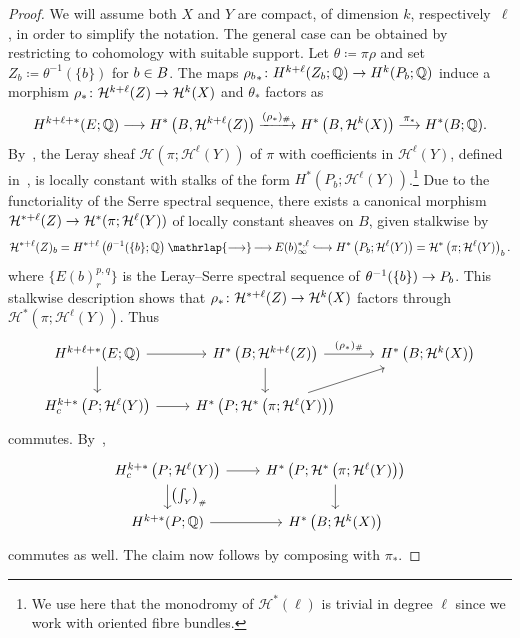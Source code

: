 \documentclass[AHL,Unicode,longabstracts]{cedram}
\newcommand{\inv}{^{-1}}
\newcommand{\cl}{\colon}
\newcommand{\bQ}{\mathbb{Q}}
\newcommand{\cH}{\mathcal{H}}
\newcommand{\xra}{\xrightarrow}
\renewcommand*{\to}{\mathchoice{\longrightarrow}{\rightarrow}{\rightarrow}{\rightarrow}}
\newcommand{\longhookrightarrow}{\lhook\joinrel\longrightarrow}
\newcommand*{\hookto}{\mathchoice{\longhookrightarrow}{\hookrightarrow}{\hookrightarrow}{\hookrightarrow}}
\newcommand*{\twoheadto}
{\mathbin{\mathrlap{\to}\mkern -2mu\to}}
\let\oldin\in
\renewcommand{\in}{\mathchoice{\oldin}{\oldin}{\,\oldin\,}{\,\oldin\,}}
\begin{document}
\begin{proof}
We will assume both $X$ and $Y$ are compact, of dimension $k$, respectively~$\ell$, in order to simplify the notation. The general case can be obtained by restricting to cohomology with suitable support. Let $\theta \coloneqq \pi\rho$ and set $Z_b \coloneqq \theta\inv(\{b\})$ for $b \in B$. The maps ${\rho_b}_*\cl H^{k+\ell}(Z_b;\bQ) \to H^k(P_b;\bQ)$ induce a morphism $\rho_*\cl \cH^{k+\ell}(Z)\to \cH^k(X)$ and $\theta_*$ factors as
\[
H^{k+\ell+*}(E;\bQ)\to H^*\left(B,\cH^{k+\ell}(Z)\right) \xra{(\rho_*)_\#} H^*\left(B,\cH^{k}(X)\right) \overset{\pi_*}{\to} H^*(B;\bQ).
\]
By~\cite[Corollary~IV.7.3]{Bre12}, the Leray sheaf $\cH(\pi;\cH^\ell(Y))$ of $\pi$ with coefficients in $\cH^\ell(Y)$, defined in~\cite[Section~IV.4]{Bre12}, is locally constant with stalks of the form $H^*(P_b;\cH^\ell(Y))$.\footnote{We use here that the monodromy of $\cH^*(\ell)$ is trivial in degree $\ell$ since we work with oriented fibre bundles.} Due to the functoriality of the Serre spectral sequence, there exists a canonical morphism $\cH^{*+\ell}(Z)\to \cH^*(\pi;\cH^\ell(Y))$ of locally constant sheaves on $B$, given stalkwise by
\[
\cH^{*+\ell}(Z)_b = H^{*+\ell}\left(\theta\inv(\{b\};\bQ\right) \twoheadto E(b)^{*,\ell}_\infty \hookto H^*\left(P_b;\cH^\ell(Y)\right) = \cH^*\left(\pi;\cH^\ell(Y)\right)_b.
\]
where $\{E(b)^{p,q}_r\}$ is the Leray--Serre spectral sequence of $\theta\inv(\{b\})\to P_b$. This stalkwise description shows that $\rho_* \cl \cH^{*+\ell}(Z)\to \cH^k(X)$ factors through $\cH^*(\pi;\cH^\ell(Y))$. Thus
\[
\begin{tikzcd}
H^{k+\ell+*}(E;\bQ) \arrow[r,] \arrow[d]& H^{*}\left(B;\cH^{k+\ell}(Z)\right)\arrow[r,"(\rho_*)_\#"]\arrow[d,] & H^*\left(B;\cH^k(X)\right)\\
H^{k+*}_{c}\left(P;\cH^\ell(Y)\right) \arrow[r,""]& H^*\left(P;\cH^*\left(\pi;\cH^\ell(Y)\right)\right)\arrow[ur]
\end{tikzcd}
\]
commutes. By~\cite[Section~6.2]{Bre12},
\[
\begin{tikzcd}
H^{k+*}_{c}\left(P;\cH^\ell(Y)\right) \arrow[r,""]\arrow[d,"\left(\int_Y\right)_\#"]& H^*\left(P;\cH^*\left(\pi;\cH^\ell(Y)\right)\right)\arrow[d,]\\
H^{k+*}(P;\bQ)\arrow[r] & H^*\left(B;\cH^k(X)\right)
\end{tikzcd}
\]
commutes as well. The claim now follows by composing with $\pi_*$.
\end{proof}
\end{document}
